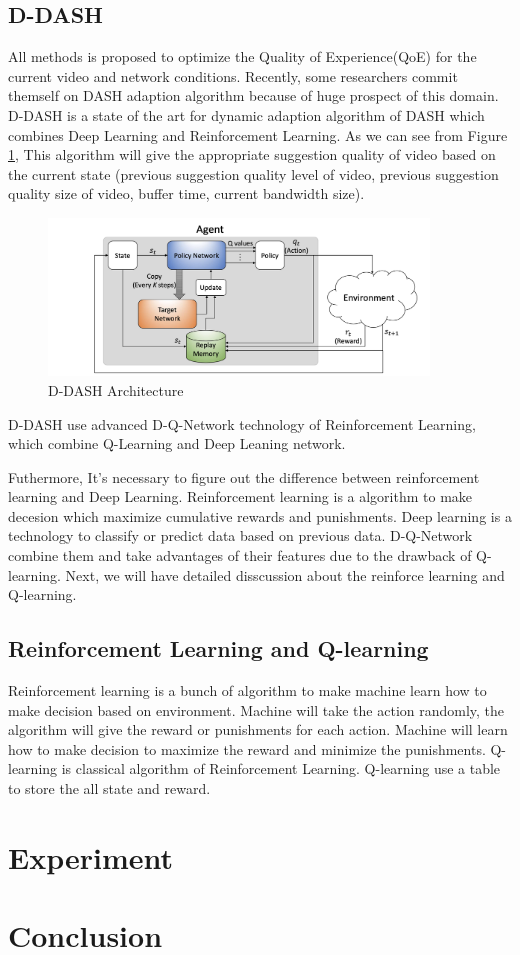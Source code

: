 \documentclass[11pt]{article}
\begin{document}
\subsection{D-DASH}
All methods is proposed to optimize the Quality of Experience(QoE) for the current video and network conditions. Recently, some researchers commit themself on DASH adaption algorithm because of huge prospect of this domain.
D-DASH is a state of the art for dynamic adaption algorithm of DASH which combines Deep Learning and Reinforcement Learning. 
As we can see from Figure \ref{D-DASH},
This algorithm will give the appropriate suggestion quality of video based on the current state (previous suggestion quality level of video, previous suggestion quality size of video, buffer time, current bandwidth size). 
\begin{figure}[htbp]
    \centering
        \includegraphics[width=0.9\textwidth]{d-dash.png}
    \caption{D-DASH Architecture}
    \label{D-DASH}
\end{figure}

D-DASH use advanced D-Q-Network technology of Reinforcement Learning, which combine Q-Learning and Deep Leaning network. 

Futhermore, It's necessary to figure out the difference between reinforcement learning and Deep Learning. 
Reinforcement learning is a algorithm to make decesion which maximize cumulative rewards and punishments.
Deep learning is a technology to classify or predict data based on previous data. D-Q-Network combine them and take advantages of their features due to the drawback of Q-learning.
Next, we will have detailed disscussion about the reinforce learning and Q-learning. 

\subsection{Reinforcement Learning and Q-learning}
Reinforcement learning is a bunch of algorithm to make machine learn how to make decision based on environment. Machine will take the action randomly, the algorithm will give the reward or punishments for each action. Machine will learn how to make decision to maximize the reward and minimize the punishments.
Q-learning is classical algorithm of Reinforcement Learning.
Q-learning use a table to store the all state and reward.

\section{Experiment}

\section{Conclusion}
\end{document}
